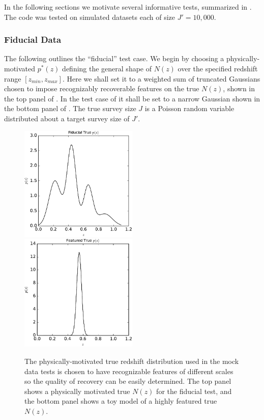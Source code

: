 In the following sections we motivate several informative tests, summarized in .  
The code was tested on simulated datasets each of size $J'=10,000$.  

\subsubsection{Fiducial Data}

The following outlines the ``fiducial'' test case.  
We begin by choosing a physically-motivated $p^{*}(z)$ defining the general shape of $N(z)$ over the specified redshift range $[z_{min},z_{max}]$.  
Here we shall set it to a weighted sum of truncated Gaussians chosen to impose recognizably recoverable features on the true $N(z)$, shown in the top panel of .  
In the test case of  it shall be set to a narrow Gaussian shown in the bottom panel of .  
The true survey size $J$ is a Poisson random variable distributed about a target survey size of $J'$.

\begin{figure}
	\includegraphics[width=0.5\textwidth]{figures/chippr/sig2_physPz.pdf}\\
	\includegraphics[width=0.5\textwidth]{figures/chippr/delt_physPz.pdf}
	\caption{The physically-motivated true redshift distribution used in the mock data tests is chosen to have recognizable features of different scales so the quality of recovery can be easily determined.  
		The top panel shows a physically motivated true $N(z)$ for the fiducial test, and the bottom panel shows a toy model of a highly featured true $N(z)$.}
\end{figure}


